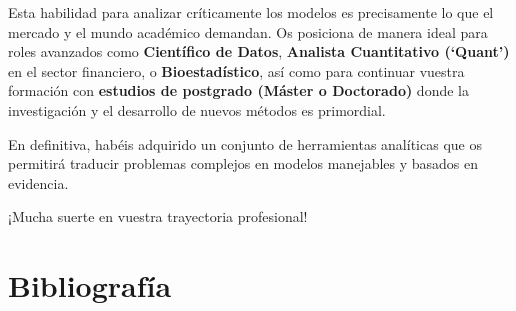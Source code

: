 \documentclass[
  letterpaper,
  DIV=11,
  numbers=noendperiod]{scrreprt}
\begin{document}
Esta habilidad para analizar críticamente los modelos es precisamente lo
que el mercado y el mundo académico demandan. Os posiciona de manera
ideal para roles avanzados como \textbf{Científico de Datos},
\textbf{Analista Cuantitativo (`Quant')} en el sector financiero, o
\textbf{Bioestadístico}, así como para continuar vuestra formación con
\textbf{estudios de postgrado (Máster o Doctorado)} donde la
investigación y el desarrollo de nuevos métodos es primordial.

En definitiva, habéis adquirido un conjunto de herramientas analíticas
que os permitirá traducir problemas complejos en modelos manejables y
basados en evidencia.

¡Mucha suerte en vuestra trayectoria profesional!


\chapter*{Bibliografía}\label{bibliografuxeda}

\end{document}
